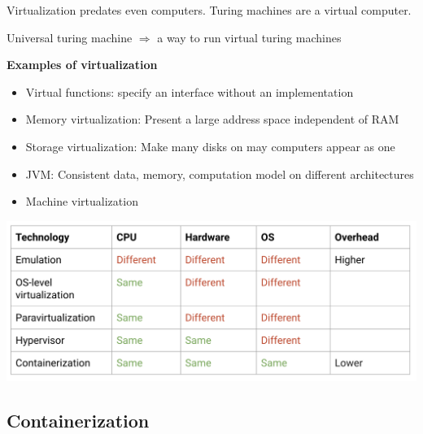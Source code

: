 \documentclass{article}
\begin{document}
Virtualization predates even computers. Turing machines are a virtual computer. 

Universal turing machine $\Rightarrow$ a way to run virtual turing machines 

\vspace*{1em}

\textbf{Examples of virtualization}
\begin{itemize}
    \item Virtual functions: specify an interface without an implementation
    \item Memory virtualization: Present a large address space independent of RAM 
    \item Storage virtualization: Make many disks on may computers appear as one 
    \item JVM: Consistent data, memory, computation model on different architectures
    \item Machine virtualization
\end{itemize}

\includegraphics*[width=\linewidth]{virtualizationOverhead.png}

\subsection{Containerization}
\end{document}
